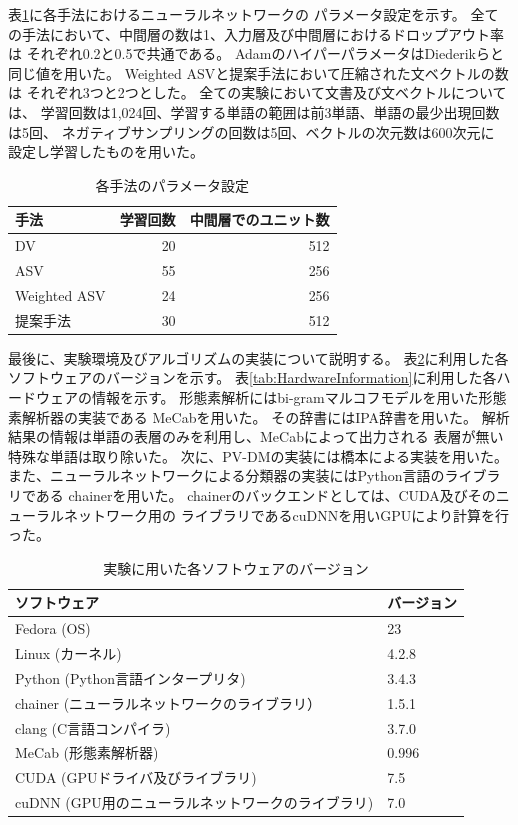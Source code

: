 表\ref{tab:ParametersOfMethods}に各手法におけるニューラルネットワークの
パラメータ設定を示す。
全ての手法において、中間層の数は1、入力層及び中間層におけるドロップアウト率は
それぞれ0.2と0.5で共通である。
Adam\cite{diederik15}のハイパーパラメータはDiederikら\cite{diederik15}と
同じ値を用いた。
Weighted ASVと提案手法において圧縮された文ベクトルの数は
それぞれ3つと2つとした。
全ての実験において文書及び文ベクトルについては、
学習回数は1,024回、学習する単語の範囲は前3単語、単語の最少出現回数は5回、
ネガティブサンプリングの回数は5回、ベクトルの次元数は600次元に
設定し学習したものを用いた。

\begin{table}
  \caption{各手法のパラメータ設定}
  \centering
  \begin{tabular}{l | r r} \label{tab:ParametersOfMethods}
    手法 & 学習回数 & 中間層でのユニット数 \\
    \hline
    DV & 20 & 512 \\
    ASV & 55 & 256 \\
    Weighted ASV & 24 & 256 \\
    提案手法 & 30 & 512 \\
  \end{tabular}
\end{table}

最後に、実験環境及びアルゴリズムの実装について説明する。
表\ref{tab:SoftwareVersions}に利用した各ソフトウェアのバージョンを示す。
表\ref{tab:HardwareInformation}に利用した各ハードウェアの情報を示す。
形態素解析にはbi-gramマルコフモデルを用いた形態素解析器の実装である
MeCabを用いた。
その辞書にはIPA辞書を用いた。
解析結果の情報は単語の表層のみを利用し、MeCabによって出力される
表層が無い特殊な単語は取り除いた。
次に、PV-DMの実装には橋本\cite{hashimoto15}による実装を用いた。
また、ニューラルネットワークによる分類器の実装にはPython言語のライブラリである
chainerを用いた。
chainerのバックエンドとしては、CUDA及びそのニューラルネットワーク用の
ライブラリであるcuDNNを用いGPUにより計算を行った。

\begin{table}
  \caption{実験に用いた各ソフトウェアのバージョン}
  \begin{tabular}{l | l} \label{tab:SoftwareVersions}
    ソフトウェア & バージョン \\
    \hline
    Fedora (OS) & 23 \\
    Linux (カーネル) & 4.2.8 \\
    Python (Python言語インタープリタ) & 3.4.3 \\
    chainer (ニューラルネットワークのライブラリ） & 1.5.1 \\
    clang (C言語コンパイラ) & 3.7.0 \\
    MeCab (形態素解析器) & 0.996 \\
    CUDA (GPUドライバ及びライブラリ) & 7.5 \\
    cuDNN (GPU用のニューラルネットワークのライブラリ) & 7.0 \\
  \end{tabular}
\end{table}

